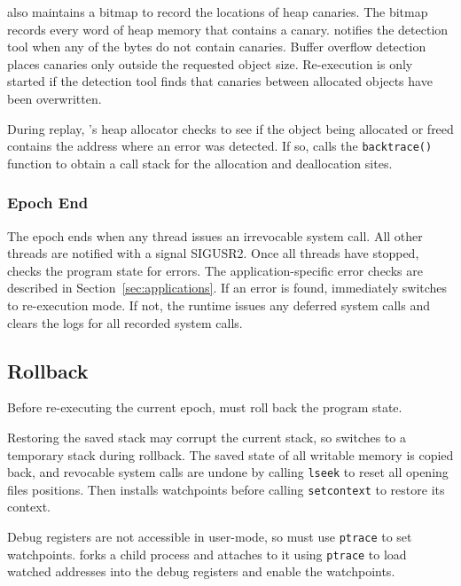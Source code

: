 \doubletake{} also maintains a bitmap to record the locations of heap canaries. The bitmap records every word of heap memory that contains a canary. \doubletake{} notifies the detection tool when any of the bytes do not contain canaries. Buffer overflow detection places canaries only outside the requested object size. Re-execution is only started if the detection tool finds that canaries between allocated objects have been overwritten.

During replay, \doubletake{}'s heap allocator checks to see if the object being allocated or freed contains the address where an error was detected. If so, \doubletake{} calls the \texttt{backtrace()} function to obtain a call stack for the allocation and deallocation sites. 

\subsubsection*{Epoch End}

The epoch ends when any thread issues an irrevocable system call. All other threads are notified with a signal SIGUSR2. Once all threads have stopped, \doubletake{} checks the program state for errors. The application-specific error checks are described in Section~\ref{sec:applications}. If an error is found, \doubletake{} immediately switches to re-execution mode. If not, the runtime issues any deferred system calls and clears the logs for all recorded system calls.


\subsection{Rollback}

Before re-executing the current epoch, \doubletake{} must roll back the program state. 

Restoring the saved stack may corrupt the current stack, so \doubletake{} switches to a temporary stack during rollback. The saved state of all writable memory is copied back, and revocable system calls are undone by calling \texttt{lseek} to reset all opening files positions. Then \doubletake{} installs watchpoints before calling \texttt{setcontext} to restore its context. 

Debug registers are not accessible in user-mode, so \doubletake{} must use \texttt{ptrace} to set watchpoints. \doubletake{} forks a child process and attaches to it using \texttt{ptrace} to load watched addresses into the debug registers and enable the watchpoints.

